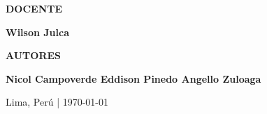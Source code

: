 \begin{titlepage}
\begin{minipage}{0.82\textwidth}
    {\color{cyan!30!white}
        \fontsize{8}{10}\selectfont
        \bfseries
        DOCENTE
    }\par

    \vspace{1mm}

    {\color{white}
        \fontsize{12}{15}\selectfont
        \bfseries
        Wilson Julca 
    }

\end{minipage}



\vfill

\begin{minipage}{0.82\textwidth}
    \sffamily

    {\color{cyan!30!white}
        \fontsize{8}{10}\selectfont
        \bfseries
        AUTORES
    }\par

    \vspace{2mm}

    {\color{white}
        \fontsize{11}{14}\selectfont
        \bfseries
        Nicol Campoverde \quad Eddison Pinedo \quad Angello Zuloaga
    }

    \vspace{5mm}

  {\color{white!80!cyan}
      \fontsize{9}{11}\selectfont
      Lima, Perú
      \quad | \quad
      \today
  }

\end{minipage}


\vspace*{14mm}

\end{titlepage}